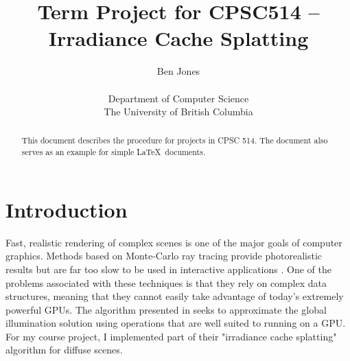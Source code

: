 \documentclass[10pt,twopage]{acmsiggraph}
\begin{document}
%
%

\title{Term Project for CPSC514 -- Irradiance Cache Splatting}

\newcommand\name{Ben Jones}

\author{\name\\
\\
Department of Computer Science\\
The University of British Columbia}

\maketitle

%
%

\begin{abstract}
  This document describes the procedure for projects in CPSC 514. The
  document also serves as an example for simple \LaTeX\ documents.
\end{abstract}

%
%

\section{Introduction}
\label{Intro}

Fast, realistic rendering of complex scenes is one of the major goals of computer graphics.  Methods based on Monte-Carlo ray tracing provide photorealistic results but are far too slow to be used in interactive applications \cite{raytracing}.  One of the problems associated with these techniques is that they rely on complex data structures, meaning that they cannot easily take advantage of today's extremely powerful GPUs.  The algorithm presented in \cite{mainpaper} seeks to approximate the global illumination solution using operations that are well suited to running on a GPU.  For my course project, I implemented part of their "irradiance cache splatting" algorithm for diffuse scenes.
\end{document}
